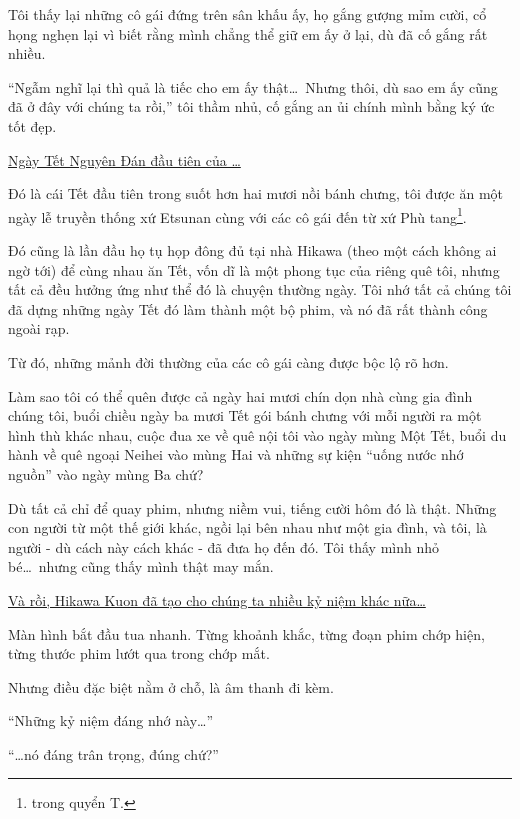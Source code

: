 \documentclass[../main.tex]{subfiles}
\begin{document}
Tôi thấy lại những cô gái đứng trên sân khấu ấy, họ gắng gượng mỉm cười, cổ họng nghẹn lại vì biết rằng mình chẳng thể giữ em ấy ở lại, dù đã cố gắng rất nhiều.

``Ngẫm nghĩ lại thì quả là tiếc cho em ấy thật\dots\ Nhưng thôi, dù sao em ấy cũng đã ở đây với chúng ta rồi,'' tôi thầm nhủ, cố gắng an ủi chính mình bằng ký ức tốt đẹp.

\begin{center}
    \uline{Ngày Tết Nguyên Đán đầu tiên của \hll\dots}
\end{center}

Đó là cái Tết đầu tiên trong suốt hơn hai mươi nồi bánh chưng, tôi được ăn một ngày lễ truyền thống xứ Etsunan cùng với các cô gái đến từ xứ Phù tang\footnote{trong quyển T.}.

Đó cũng là lần đầu họ tụ họp đông đủ tại nhà Hikawa (theo một cách không ai ngờ tới) để cùng nhau ăn Tết, vốn dĩ là một phong tục của riêng quê tôi, nhưng tất cả đều hưởng ứng như thể đó là chuyện thường ngày. Tôi nhớ tất cả chúng tôi đã dựng những ngày Tết đó làm thành một bộ phim, và nó đã rất thành công ngoài rạp.

Từ đó, những mảnh đời thường của các cô gái càng được bộc lộ rõ hơn.

Làm sao tôi có thể quên được cả ngày hai mươi chín dọn nhà cùng gia đình chúng tôi, buổi chiều ngày ba mươi Tết gói bánh chưng với mỗi người ra một hình thù khác nhau, cuộc đua xe về quê nội tôi vào ngày mùng Một Tết, buổi du hành về quê ngoại Neihei vào mùng Hai và những sự kiện ``uống nước nhớ nguồn'' vào ngày mùng Ba chứ?

Dù tất cả chỉ để quay phim, nhưng niềm vui, tiếng cười hôm đó là thật. Những con người từ một thế giới khác, ngồi lại bên nhau như một gia đình, và tôi, là người - dù cách này cách khác - đã đưa họ đến đó. Tôi thấy mình nhỏ bé\dots\ nhưng cũng thấy mình thật may mắn.

\begin{center}
    \uline{Và rồi, Hikawa Kuon đã tạo cho chúng ta nhiều kỷ niệm khác nữa\dots}
\end{center}

Màn hình bắt đầu tua nhanh. Từng khoảnh khắc, từng đoạn phim chớp hiện, từng thước phim lướt qua trong chớp mắt.

Nhưng điều đặc biệt nằm ở chỗ, là âm thanh đi kèm.

\il

``Những kỷ niệm đáng nhớ này\dots''

``\dots nó đáng trân trọng, đúng chứ?''
\end{document}
